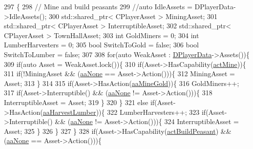 \begin{DoxyCode}
297                                                                               \{
298     \textcolor{comment}{// Mine and build peasants}
299     \textcolor{comment}{//auto IdleAssets = DPlayerData->IdleAssets();}
300     std::shared\_ptr< CPlayerAsset > MiningAsset;
301     std::shared\_ptr< CPlayerAsset > InterruptibleAsset;
302     std::shared\_ptr< CPlayerAsset > TownHallAsset;
303     \textcolor{keywordtype}{int} GoldMiners = 0;
304     \textcolor{keywordtype}{int} LumberHarvesters = 0;
305     \textcolor{keywordtype}{bool} SwitchToGold = \textcolor{keyword}{false};
306     \textcolor{keywordtype}{bool} SwitchToLumber = \textcolor{keyword}{false};
307     
308     \textcolor{keywordflow}{for}(\textcolor{keyword}{auto} WeakAsset : \hyperlink{classCAIPlayer_a83b5113c8f7e80df54940b647c5ee2e6}{DPlayerData}->Assets())\{
309         \textcolor{keywordflow}{if}(\textcolor{keyword}{auto} Asset = WeakAsset.lock())\{
310             \textcolor{keywordflow}{if}(Asset->HasCapability(\hyperlink{GameDataTypes_8h_a35b98ce26aca678b03c6f9f76e4778cea2e0db284fd05caa56e3867c661ccdd8b}{actMine}))\{
311                 \textcolor{keywordflow}{if}(!MiningAsset && (\hyperlink{GameDataTypes_8h_ab47668e651a3032cfb9c40ea2d60d670ac17cc5a0035320c060d7f8074143b507}{aaNone} == Asset->Action()))\{
312                     MiningAsset = Asset;
313                 \}
314                 
315                 \textcolor{keywordflow}{if}(Asset->HasAction(\hyperlink{GameDataTypes_8h_ab47668e651a3032cfb9c40ea2d60d670abc45b1c4fbca1481e373a780a69bd56b}{aaMineGold}))\{
316                     GoldMiners++; 
317                     \textcolor{keywordflow}{if}(Asset->Interruptible() && (\hyperlink{GameDataTypes_8h_ab47668e651a3032cfb9c40ea2d60d670ac17cc5a0035320c060d7f8074143b507}{aaNone} != Asset->Action()))\{
318                         InterruptibleAsset = Asset;
319                     \}
320                 \}
321                 \textcolor{keywordflow}{else} \textcolor{keywordflow}{if}(Asset->HasAction(\hyperlink{GameDataTypes_8h_ab47668e651a3032cfb9c40ea2d60d670a4c44c3d83b3b67a8dd2248d11bedd0ee}{aaHarvestLumber}))\{
322                     LumberHarvesters++;
323                     \textcolor{keywordflow}{if}(Asset->Interruptible() && (\hyperlink{GameDataTypes_8h_ab47668e651a3032cfb9c40ea2d60d670ac17cc5a0035320c060d7f8074143b507}{aaNone} != Asset->Action()))\{
324                         InterruptibleAsset = Asset;
325                     \}
326                 \}
327             \}
328             \textcolor{keywordflow}{if}(Asset->HasCapability(\hyperlink{GameDataTypes_8h_a35b98ce26aca678b03c6f9f76e4778cea66c601dce0fc095460b3c2c25f66ee71}{actBuildPeasant}) && (\hyperlink{GameDataTypes_8h_ab47668e651a3032cfb9c40ea2d60d670ac17cc5a0035320c060d7f8074143b507}{aaNone} == Asset->Action()))\{

\end{DoxyCode}
